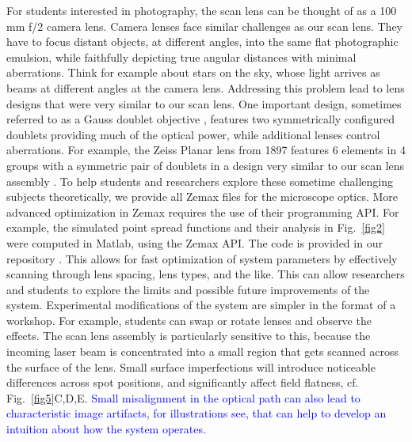 \documentclass[10pt,letterpaper]{article}
\begin{document}
For students interested in photography, the scan lens can be thought of as a 100 mm f/2 camera lens. Camera lenses face similar challenges as our scan lens. They have to focus distant objects, at different angles, into the same flat photographic emulsion, while faithfully depicting true angular distances with minimal aberrations. Think for example about stars on the sky, whose light arrives as beams at different angles at the camera lens. Addressing this problem lead to lens designs that were very similar to our scan lens. One important design, sometimes referred to as a Gauss doublet objective \cite{Kidger2001}, features two symmetrically configured doublets providing much of the optical power, while additional lenses control aberrations. For example, the Zeiss Planar lens from 1897 features 6 elements in 4 groups with a symmetric pair of doublets in a design very similar to our scan lens assembly \cite{Rudolf1897}. To help students and researchers explore these sometime challenging subjects theoretically, we provide all Zemax files for the microscope optics. More advanced optimization in Zemax requires the use of their programming API. For example, the simulated point spread functions and their analysis in Fig.~\ref{fig2} were computed in Matlab, using the Zemax API. The code is provided in our repository \cite{Zenodo2024}. This allows for fast optimization of system parameters by effectively scanning through lens spacing, lens types, and the like. This can allow researchers and students to explore the limits and possible future improvements of the system. Experimental modifications of the system are simpler in the format of a workshop. For example, students can swap or rotate lenses and observe the effects. The scan lens assembly is particularly sensitive to this, because the incoming laser beam is concentrated into a small region that gets scanned across the surface of the lens. Small surface imperfections will introduce noticeable differences across spot positions, and significantly affect field flatness, cf. Fig.~\ref{fig5}C,D,E. \textcolor{blue}{Small misalignment in the optical path can also lead to characteristic image artifacts, for illustrations see\cite{Corbett2014, Lees2024}, that can help to develop an intuition about how the system operates.}\newline
\end{document}
